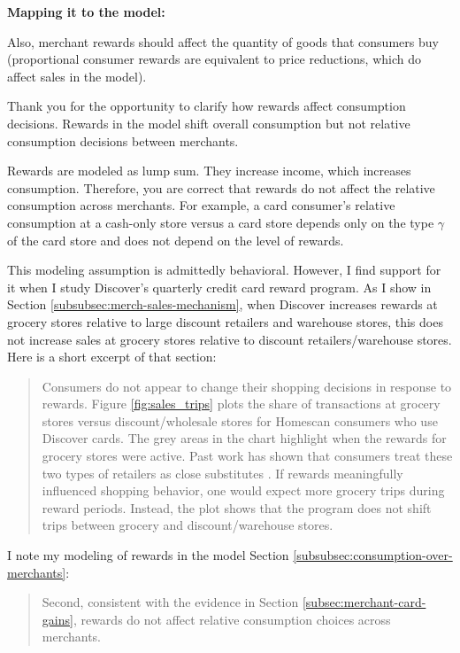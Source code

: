 \documentclass[main.tex]{subfiles}
\begin{document}
\begin{refsection}
\textbf{Mapping it to the model: } \replycreditdebitmultimodel

\begin{refcomment}
Also, merchant rewards should affect the quantity of goods that consumers buy (proportional consumer rewards are equivalent to price reductions, which do affect sales in the model).
\end{refcomment}

Thank you for the opportunity to clarify how rewards affect consumption decisions.
Rewards in the model shift overall consumption but not relative consumption decisions between merchants.

Rewards are modeled as lump sum.
They increase income, which increases consumption.
Therefore, you are correct that rewards do not affect the relative consumption across merchants.
For example, a card consumer's relative consumption at a cash-only store versus a card store depends only on the type $\gamma$ of the card store and does not depend on the level of rewards.

This modeling assumption is admittedly behavioral.
However, I find support for it when I study Discover's quarterly credit card reward program.
As I show in Section \ref{subsubsec:merch-sales-mechanism}, when Discover increases rewards at grocery stores relative to large discount retailers and warehouse stores, this does not increase sales at grocery stores relative to discount retailers/warehouse stores.
Here is a short excerpt of that section:

\begin{quotation}
    Consumers do not appear to change their shopping decisions in response to rewards.
Figure \ref{fig:sales_trips} plots the share of transactions at grocery stores versus discount/wholesale stores for Homescan consumers who use Discover cards.
The grey areas in the chart highlight when the rewards for grocery stores were active.
Past work has shown that consumers treat these two types of retailers as close substitutes \parencite{Ellickson.etal2020}.
If rewards meaningfully influenced shopping behavior, one would expect more grocery trips during reward periods.
Instead, the plot shows that the program does not shift trips between grocery and discount/warehouse stores.
\end{quotation}

I note my modeling of rewards in the model Section \ref{subsubsec:consumption-over-merchants}:

\begin{quotation}
    Second, consistent with the evidence in Section \ref{subsec:merchant-card-gains}, rewards do not affect relative consumption choices across merchants.
\end{quotation}


\end{refsection}
\end{document}
